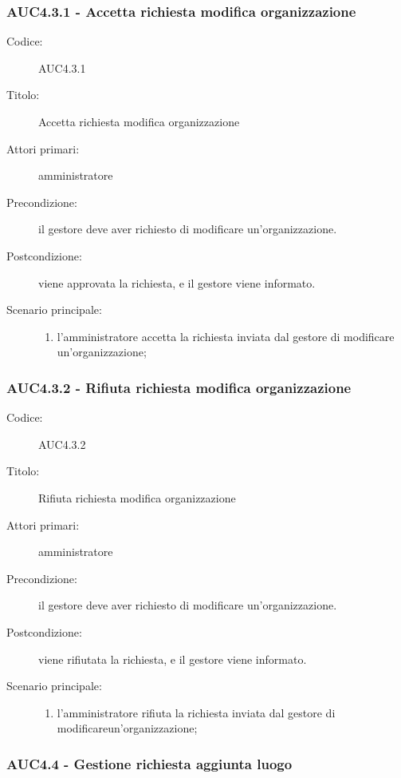 \documentclass[casi-duso]{subfiles}
\begin{document}
\subsubsection{AUC4.3.1 - Accetta richiesta modifica organizzazione}%
\label{subsub:AUC4.3.1}
\begin{description}
  \item[Codice:] AUC4.3.1
  \item[Titolo:] Accetta richiesta modifica organizzazione
  \item[Attori primari:] amministratore
  \item[Precondizione:] il gestore deve aver richiesto di modificare un'organizzazione.
  \item[Postcondizione:] viene approvata la richiesta, e il gestore viene informato.
  \item[Scenario principale:]
  \begin{enumerate}
    \item  l'amministratore accetta la richiesta inviata dal gestore di modificare un'organizzazione;
  \end{enumerate}
\end{description}

\subsubsection{AUC4.3.2 - Rifiuta richiesta modifica organizzazione}%
\label{subsub:AUC4.3.2}
\begin{description}
  \item[Codice:] AUC4.3.2
  \item[Titolo:] Rifiuta richiesta modifica organizzazione
  \item[Attori primari:] amministratore
  \item[Precondizione:] il gestore deve aver richiesto di modificare un'organizzazione.
  \item[Postcondizione:] viene rifiutata la richiesta, e il gestore viene informato.
  \item[Scenario principale:]
  \begin{enumerate}
    \item l'amministratore rifiuta la richiesta inviata dal gestore di modificareun'organizzazione;
  \end{enumerate}
\end{description}

\subsubsection{AUC4.4 - Gestione richiesta aggiunta luogo}%
\label{subsub:AUC4.4}
\end{document}
